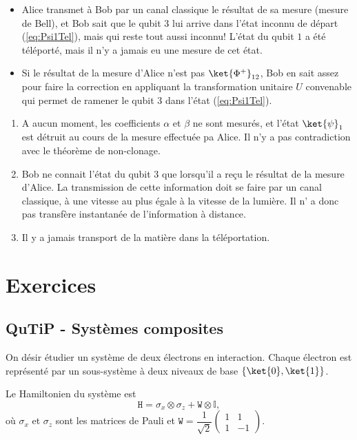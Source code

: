 \begin{itemize}
\item Alice transmet à Bob par un canal classique le résultat de sa mesure
(mesure de Bell), et Bob sait que le qubit $3$ lui arrive dans l'état inconnu
de départ (\ref{eq:Psi1Tel}), mais qui reste tout aussi inconnu! L'état du
qubit $1$ a été téléporté, mais il n'y a jamais eu une mesure de cet état.

\item Si le résultat de la mesure d'Alice n'est pas $\ket{\Phi^{+}}_{12}$, Bob
en sait assez pour faire la correction en appliquant la transformation unitaire
$U$ convenable qui permet de ramener le qubit $3$ dans l'état
(\ref{eq:Psi1Tel}).
\end{itemize}

\begin{remark}
\begin{enumerate}
\item A aucun moment, les coefficients $\alpha$ et $\beta$ ne sont mesurés, et
l'état $\ket{\psi}_{1}$ est détruit au cours de la mesure effectuée pa Alice. Il
n'y a pas contradiction avec le théorème de non-clonage.

\item Bob ne connait l'état du qubit $3$ que lorsqu'il a reçu le résultat de la
mesure d'Alice. La transmission de cette information doit se faire par un canal
classique, à une vitesse au plus égale à la vitesse de la lumière. Il n' a donc
pas transfère instantanée de l'information à distance.

\item Il y a jamais transport de la matière dans la téléportation.
\end{enumerate}
\end{remark}

\newpage

\section{Exercices}

\subsection{QuTiP - Systèmes composites}

On désir étudier un système de deux électrons en interaction. Chaque électron 
est représenté par un sous-système à deux niveaux de base 
$\{\ket{0},\ket{1}\}$. 

Le Hamiltonien du système est
\begin{equation}
\mathtt{H} = \sigma_x\otimes\sigma_z+\mathtt{W}\otimes\mathbb{I},
\end{equation}
où $\sigma_x$ et $\sigma_z$ sont les matrices de Pauli et 
$\mathtt{W}=\dfrac{1}{\sqrt{2}}\begin{pmatrix}1 & 1 \\ 1 & -1 \end{pmatrix}$.

